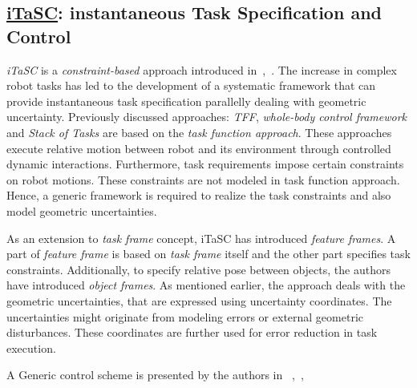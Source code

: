 \subsection{\hyperref[itasc]{iTaSC}: instantaneous Task Specification and Control}

\textit{iTaSC} is a \textit{constraint-based} approach introduced in~\cite{de2007constraint},~\cite{smits2009itasc}. The increase in complex robot tasks has led to the development of a systematic framework that can provide instantaneous task specification parallelly dealing with geometric uncertainty. Previously discussed approaches: \textit{TFF}, \textit{whole-body control framework} and \textit{Stack of Tasks} are based on the \textit{task function approach}. These approaches execute relative motion between robot and its environment through controlled dynamic interactions. Furthermore, task requirements impose certain constraints on robot motions. These constraints are not modeled in task function approach. Hence, a generic framework is required to realize the task constraints and also model geometric uncertainties. 


As an extension to \textit{task frame} concept, iTaSC has introduced \textit{feature frames}. A part of \textit{feature frame} is based on \textit{task frame} itself and the other part specifies task constraints. Additionally, to specify relative pose between objects, the authors have introduced \textit{object frames}. As mentioned earlier, the approach deals with the geometric uncertainties, that are expressed using uncertainty coordinates. The uncertainties might originate from modeling errors or external geometric disturbances. These coordinates are further used for error reduction in task execution. 

A Generic control scheme is presented by the authors in ~\cite{de2007constraint},~\cite{smits2009itasc},


